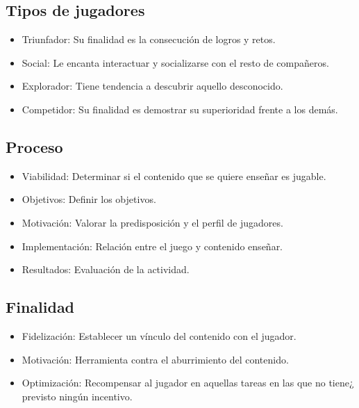 \subsection{Tipos de jugadores}\cite{gameficacion}
\begin{itemize}
	\item Triunfador: Su finalidad es la consecución de logros y retos.
	\item Social: Le encanta interactuar y socializarse con el resto de compañeros.
	\item Explorador: Tiene tendencia a descubrir aquello desconocido.
	\item Competidor: Su finalidad es demostrar su superioridad frente a los demás.
\end{itemize}

\subsection{Proceso}\cite{gameficacion}
\begin{itemize}
	\item Viabilidad: Determinar si el contenido que se quiere enseñar es jugable.
	\item Objetivos: Definir los objetivos.
	\item Motivación: Valorar la predisposición y el perfil de jugadores.
	\item Implementación: Relación entre el juego y contenido enseñar.
	\item Resultados: Evaluación de la actividad.
\end{itemize}

\subsection{Finalidad}\cite{gameficacion}
\begin{itemize}
	\item Fidelización: Establecer un vínculo del contenido con el jugador.
	\item Motivación: Herramienta contra el aburrimiento del contenido.
	\item Optimización: Recompensar al jugador en aquellas tareas en las que no tiene¿ previsto ningún incentivo.
\end{itemize}